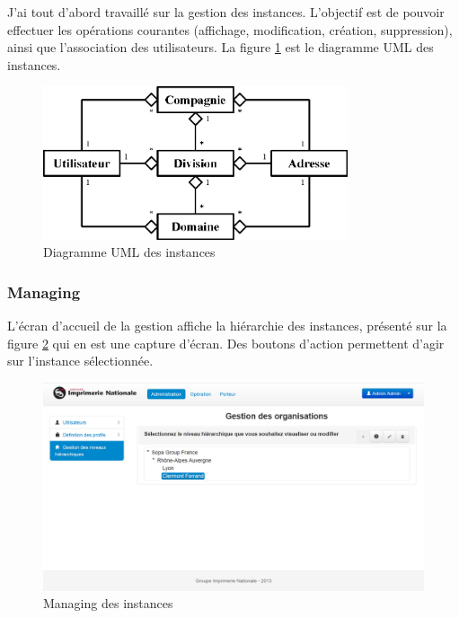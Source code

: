 J'ai tout d'abord travaillé sur la gestion des instances.
L'objectif est de pouvoir effectuer les opérations courantes (affichage, modification, création, suppression), ainsi que l'association des utilisateurs.
La figure \ref{instances_UML} est le diagramme UML des instances.
\begin{figure}[!h]
	\center
	\includegraphics[width=0.8\textwidth]{img/instances_UML.png}
	\caption{Diagramme UML des instances}
	\label{instances_UML}
\end{figure}


\subsubsection{Managing}

L'écran d'accueil de la gestion affiche la hiérarchie des instances, présenté sur la figure \ref{instances_managing} qui en est une capture d'écran.
Des boutons d'action permettent d'agir sur l'instance sélectionnée.
\begin{figure}[!h]
	\center
	\includegraphics[width=1\textwidth]{img/instances_managing.png}
	\caption{Managing des instances}
	\label{instances_managing}
\end{figure}
~~\\

